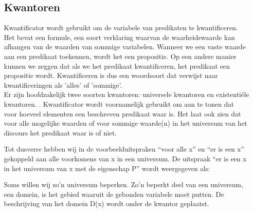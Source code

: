 \documentclass{article}
\begin{document}
	\subsection{Kwantoren}
	Kwantificator wordt gebruikt om de variabele van predikaten te kwantificeren. Het bevat een formule, een soort verklaring waarvan de waarheidswaarde kan afhangen van de waarden van sommige variabelen. Wanneer we een vaste waarde aan een predikaat toekennen, wordt het een propositie. Op een andere manier kunnen we zeggen dat als we het predikaat kwantificeren, het predikaat een propositie wordt. Kwantificeren is dus een woordsoort dat verwijst naar kwantificeringen als 'alles' of 'sommige'.\\	Er zijn hoofdzakelijk twee soorten kwantoren: universele kwantoren en existentiële kwantoren. . Kwantificator wordt voornamelijk gebruikt om aan te tonen dat voor hoeveel elementen een beschreven predikaat waar is. Het laat ook zien dat voor alle mogelijke waarden of voor sommige waarde(n) in het universum van het discours het predikaat waar is of niet.
	
	
	Tot dusverre hebben wij in de voorbeelduitspraken “voor alle x” en “er is een x” gekoppeld
	aan alle voorkomens van x in een universum. De uitspraak “er is een x in het
	universum van x met de eigenschap P” wordt weergegeven als:
	
	
	Soms willen wij zo’n universum beperken. Zo’n beperkt deel van een universum, een
	domein, is het gebied waaruit de gebonden variabele moet putten. De beschrijving van
	het domein D(x) wordt onder de kwantor geplaatst.
	
\end{document}
